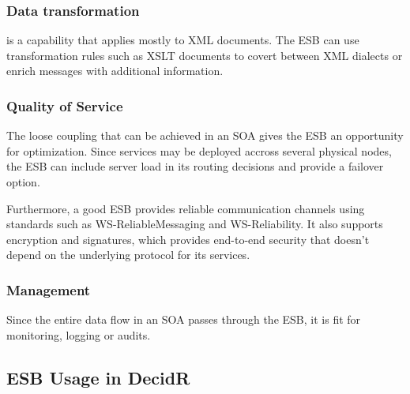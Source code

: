 \subsubsection{Data transformation}
\label{subsec:data-transformation}

is a capability that applies mostly to XML documents. The
ESB can use transformation rules such as XSLT documents to covert between XML
dialects or enrich messages with additional information.


\subsubsection{Quality of Service}
\label{subsec:quality-of-service}

The loose coupling that can be achieved in an SOA gives the ESB an opportunity
for optimization. Since services may be deployed accross several physical nodes,
the ESB can include server load in its routing decisions and provide a failover
option.

Furthermore, a good ESB provides reliable communication channels using standards
such as WS-ReliableMessaging and WS-Reliability. It also supports encryption and
signatures, which provides end-to-end security that doesn't depend on the
underlying protocol for its services.

\subsubsection{Management}
\label{subsec:management}

Since the entire data flow in an SOA passes through the ESB, it is
fit for monitoring, logging or audits.


\subsection{ESB Usage in DecidR}
\label{subsec:esb-usage-in-decidr}

